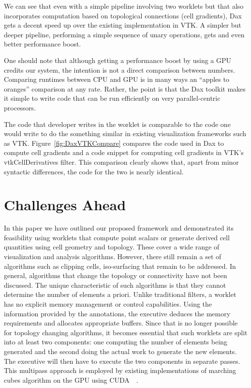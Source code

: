 \documentclass{vgtc}                          %
\newcommand*{\lcite}[1]{~\cite{#1}}
\begin{document}

We can see that even with a simple pipeline involving two worklets but that
also incorporates computation based on topological connections (cell
gradients), Dax gets a decent speed up over the existing implementation in
VTK.  A simpler but deeper pipeline, performing a simple sequence of unary
operations, gets and even better performance boost.

One should note that although getting a performance boost by using a GPU
credits our system,  the intention is not a direct comparison between
numbers.  Comparing runtimes between CPU and GPU is in many ways an
``apples to oranges'' comparison at any rate.  Rather, the point is that
the Dax toolkit makes it simple to write code that can be run efficiently
on very parallel-centric processors.

The code that developer writes in the worklet is comparable to the code
one would write to do the something similar in existing visualization frameworks
such as VTK. Figure~\ref{fig:DaxVTKCompare} compares the code used in Dax
to compute cell gradients and a code snippet for computing cell gradients
in VTK's vtkCellDerivatives filter.  This comparison clearly shows that,
apart from minor syntactic differences, the code for the two is nearly
identical.

\section{Challenges Ahead}
\label{sec:Challenges}

In this paper we have outlined our proposed framework and demonstrated its
feasibility using worklets that compute point scalars or generate derived cell
quantities using cell geometry and topology. These cover a wide range of
visualization and analysis algorithms. However, there still remain a set of
algorithms such as clipping cells, iso-surfacing that remain to be addressed. In
general, algorithms that change the topology or connectivity have not been
discussed. The unique characteristic of such algorithms is that they cannot
determine the number of elements a priori. Unlike traditional filters, a
worklet has no explicit memory management or control capabilities. Using the
information provided by the annotations, the executive deduces the memory
requirements and allocates appropriate buffers. Since that is no longer possible
for topology changing algorithms, it becomes essential that such worklets are
split into at least two components: one computing the number of elements being
generated and the second doing the actual work to generate the new elements. The
executive will then have to execute the two components in separate passes. This
multipass approach is employed by existing implementations of marching
cubes algorithm on the GPU using CUDA~\lcite{CudaMarchingCubes}.
\end{document}
